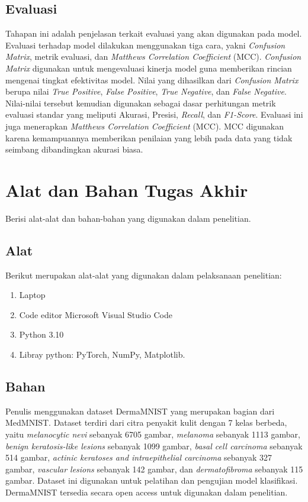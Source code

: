 \subsection{Evaluasi} \label{III.Langkah 7}
Tahapan ini adalah penjelasan terkait evaluasi yang akan digunakan pada model. 
Evaluasi terhadap model dilakukan menggunakan tiga cara, yakni \textit{Confusion 
Matrix}, metrik evaluasi, dan \textit{Matthews Correlation Coefficient} (MCC). 
\textit{Confusion Matrix} digunakan untuk mengevaluasi kinerja model guna 
memberikan rincian mengenai tingkat efektivitas model. Nilai yang dihasilkan 
dari \textit{Confusion Matrix} berupa nilai \textit{True Positive}, 
\textit{False Positive}, \textit{True Negative}, dan \textit{False Negative}. 
Nilai-nilai tersebut kemudian digunakan sebagai dasar perhitungan metrik 
evaluasi standar yang meliputi Akurasi, Presisi, \textit{Recall}, dan 
\textit{F1-Score}. Evaluasi ini juga menerapkan \textit{Matthews Correlation 
Coefficient} (MCC). MCC digunakan karena kemampuannya memberikan penilaian 
yang lebih pada data yang tidak seimbang dibandingkan akurasi biasa. \par

\section{Alat dan Bahan Tugas Akhir} \label{III.Alat dan Bahan}
Berisi alat-alat dan bahan-bahan yang digunakan dalam penelitian. \par

\subsection{Alat} \label{III.Alat}
Berikut merupakan alat-alat yang digunakan dalam pelaksanaan penelitian: \par
\begin{enumerate}[noitemsep]
	\item Laptop
	\item Code editor Microsoft Visual Studio Code
	\item Python 3.10
	\item Libray python: PyTorch, NumPy, Matplotlib.
\end{enumerate}

\subsection{Bahan} \label{III.Bahan}
Penulis menggunakan dataset DermaMNIST yang merupakan bagian dari MedMNIST. 
Dataset terdiri dari citra penyakit kulit dengan 7 kelas berbeda, yaitu 
\textit{melanocytic nevi} sebanyak 6705 gambar, 
\textit{melanoma} sebanyak 1113 gambar, 
\textit{benign keratosis-like lesions} sebanyak 1099 gambar,
\textit{basal cell carcinoma} sebanyak 514 gambar,
\textit{actinic keratoses and intraepithelial carcinoma} sebanyak 327 gambar,
\textit{vascular lesions} sebanyak 142 gambar, dan 
\textit{dermatofibroma} sebanyak 115 gambar.
Dataset ini digunakan untuk pelatihan dan pengujian model klasifikasi. DermaMNIST
tersedia secara open access untuk digunakan dalam penelitian. \par

